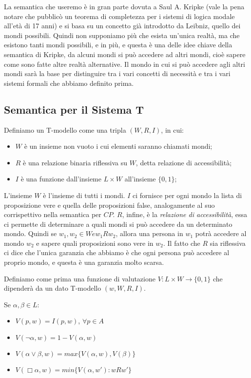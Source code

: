\documentclass[a4paper, titlepage, 12pt]{report}
\begin{document}
La semantica che useremo è in gran parte dovuta a Saul A. Kripke (vale la pena notare
che pubblicò un teorema di completezza per i sistemi di logica modale all'età di 17 anni)
e si basa su un concetto già introdotto da Leibniz, quello dei mondi possibili.
Quindi non supponiamo più che esista un'unica realtà, ma che esistono tanti mondi possibili,
e in più, e questa è una delle idee chiave della semantica di Kripke, da alcuni mondi
si può accedere ad altri mondi, cioè sapere come sono fatte altre realtà alternative.
Il mondo in cui si può accedere agli altri mondi sarà la base per distinguire
tra i vari concetti di necessità e tra i vari sistemi formali che abbiamo definito prima.

\subsection{Semantica per il Sistema T}
Definiamo un T-modello come una tripla $(W, R, I)$, in cui:
\begin{itemize}
\item $W$ è un insieme non vuoto i cui elementi saranno chiamati mondi;
\item $R$ è una relazione binaria riflessiva su $W$, detta relazione di accessibilità;
\item $I$ è una funzione dall'insieme $L \times W$ all'insieme $\{0, 1\}$;
\end{itemize}

L'insieme $W$ è l'insieme di tutti i mondi.
$I$ ci fornisce per ogni mondo la lista di proposizione vere
e quella delle proposizioni false, analogamente al suo corrispettivo nella semantica per $CP$.
$R$, infine, è la \textit{relazione di accessibilità},
essa ci permette di determinare a quali mondi si può accedere da un determinato mondo.
Quindi se $w_1, w_2 \in W e w_1 R w_2$, allora una persona in $w_1$ potrà accedere
al mondo $w_2$ e sapere quali proposizioni sono vere in $w_2$.
Il fatto che $R$ sia riflessiva ci dice che l'unica garanzia che abbiamo
è che ogni persona può accedere al proprio mondo, e questa è una garanzia molto scarsa.

Definiamo come prima una funzione di valutazione $V : L \times W \to \{0, 1\}$ che dipenderà da un dato T-modello
$(w, W, R, I)$.

Se $\alpha, \beta \in L$:
\begin{itemize}
\item $V(p, w) = I(p, w)$, $\forall p \in A$
\item $V(\neg \alpha, w) = 1 - V(\alpha, w)$
\item $V(\alpha \vee \beta, w) = max\{V(\alpha, w), V(\beta)\}$
\item $V(\Box \alpha, w) = min\{ V(\alpha, w') : w R w' \}$
\end{itemize}
\end{document}
